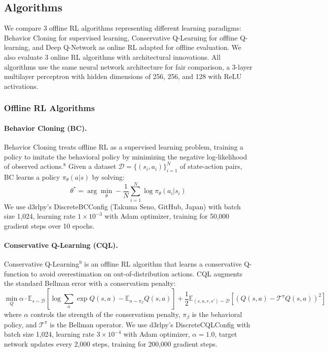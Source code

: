 \subsection{Algorithms}\label{sec:methods:algos}

We compare 3 offline RL algorithms representing different learning paradigms: Behavior Cloning for supervised learning, Conservative Q-Learning for offline Q-learning, and Deep Q-Network as online RL adapted for offline evaluation. We also evaluate 3 online RL algorithms with architectural innovations. All algorithms use the same neural network architecture for fair comparison, a 3-layer multilayer perceptron with hidden dimensions of 256, 256, and 128 with ReLU activations.

\subsubsection{Offline RL Algorithms}

\paragraph{Behavior Cloning (BC).}
Behavior Cloning treats offline RL as a supervised learning problem, training a policy to imitate the behavioral policy by minimizing the negative log-likelihood of observed actions.$^{8}$ Given a dataset $\mathcal{D} = \{(s_i, a_i)\}_{i=1}^N$ of state-action pairs, BC learns a policy $\pi_{\theta}(a|s)$ by solving:
\begin{equation}
\theta^* = \arg\min_{\theta} -\frac{1}{N} \sum_{i=1}^N \log \pi_{\theta}(a_i | s_i)
\end{equation}
We use d3rlpy's DiscreteBCConfig (Takuma Seno, GitHub, Japan) with batch size 1,024, learning rate $1 \times 10^{-3}$ with Adam optimizer, training for 50,000 gradient steps over 10 epochs.

\paragraph{Conservative Q-Learning (CQL).}
Conservative Q-Learning$^{9}$ is an offline RL algorithm that learns a conservative Q-function to avoid overestimation on out-of-distribution actions. CQL augments the standard Bellman error with a conservatism penalty:
\begin{equation}
\min_Q \alpha \cdot \mathbb{E}_{s \sim \mathcal{D}} \left[ \log \sum_a \exp Q(s, a) - \mathbb{E}_{a \sim \pi_\beta} Q(s, a) \right] + \frac{1}{2} \mathbb{E}_{(s,a,r,s') \sim \mathcal{D}} \left[ (Q(s,a) - \mathcal{T}^\pi Q(s,a))^2 \right]
\end{equation}
where $\alpha$ controls the strength of the conservatism penalty, $\pi_\beta$ is the behavioral policy, and $\mathcal{T}^\pi$ is the Bellman operator. We use d3rlpy's DiscreteCQLConfig with batch size 1,024, learning rate $3 \times 10^{-4}$ with Adam optimizer, $\alpha = 1.0$, target network updates every 2,000 steps, training for 200,000 gradient steps.

